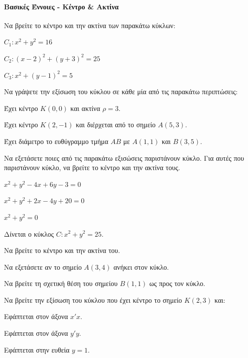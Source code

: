 \documentclass[11pt,a4paper,modern]{FFExercises}
\begin{document}

\paragraph{Βασικές Έννοιες - Κέντρο \& Ακτίνα}

\askhsh
Να βρείτε το κέντρο και την ακτίνα των παρακάτω κύκλων:
\begin{alist}
    \item $C_1: x^2 + y^2 = 16$
    \item $C_2: (x-2)^2 + (y+3)^2 = 25$
    \item $C_3: x^2 + (y-1)^2 = 5$
\end{alist}

\askhsh
Να γράψετε την εξίσωση του κύκλου σε κάθε μία από τις παρακάτω περιπτώσεις:
\begin{alist}
    \item Έχει κέντρο $K(0,0)$ και ακτίνα $\rho=3$.
    \item Έχει κέντρο $K(2,-1)$ και διέρχεται από το σημείο $A(5,3)$.
    \item Έχει διάμετρο το ευθύγραμμο τμήμα $AB$ με $A(1,1)$ και $B(3,5)$.
\end{alist}

\askhsh
Να εξετάσετε ποιες από τις παρακάτω εξισώσεις παριστάνουν κύκλο. Για αυτές που παριστάνουν κύκλο, να βρείτε το κέντρο και την ακτίνα τους.
\begin{alist}
    \item $x^2 + y^2 - 4x + 6y - 3 = 0$
    \item $x^2 + y^2 + 2x - 4y + 20 = 0$
    \item $x^2 + y^2 = 0$
\end{alist}

\askhsh
Δίνεται ο κύκλος $C: x^2 + y^2 = 25$.
\begin{alist}
    \item Να βρείτε το κέντρο και την ακτίνα του.
    \item Να εξετάσετε αν το σημείο $A(3,4)$ ανήκει στον κύκλο.
    \item Να βρείτε τη σχετική θέση του σημείου $B(1,1)$ ως προς τον κύκλο.
\end{alist}

\askhsh
Να βρείτε την εξίσωση του κύκλου που έχει κέντρο το σημείο $K(2,3)$ και:
\begin{alist}
    \item Εφάπτεται στον άξονα $x'x$.
    \item Εφάπτεται στον άξονα $y'y$.
    \item Εφάπτεται στην ευθεία $y=1$.
\end{alist}
\end{document}
